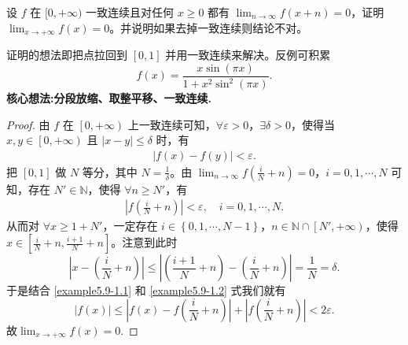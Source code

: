 \documentclass[../../main.tex]{subfiles}%
\begin{document}
\begin{example}
设 \( f \) 在 \([0,+\infty)\) 一致连续且对任何 \( x \geqslant  0 \) 都有 \(\lim_{n \to \infty} f(x+n) = 0\)，证明 \(\lim_{x \to +\infty} f(x) = 0\)。并说明如果去掉一致连续则结论不对。
\end{example}
\begin{note}
证明的想法即把点拉回到 \([0,1]\) 并用一致连续来解决。反例可积累
\[
f(x) = \frac{x \sin (\pi x)}{1 + x^2 \sin^2 (\pi x)}.
\]
\textbf{核心想法:分段放缩、取整平移、一致连续.}
\end{note}
\begin{proof}

由 $f$ 在 $\left[ 0, +\infty \right)$ 上一致连续可知，$\forall \varepsilon > 0$，$\exists \delta > 0$，使得当 $x, y \in \left[ 0, +\infty \right)$ 且 $\left| x - y \right| \leqslant \delta$ 时，有
\begin{align}
\left| f\left( x \right) - f\left( y \right) \right| < \varepsilon. \label{example5.9-1.1}
\end{align}
把 $\left[ 0,1 \right]$ 做 $N$ 等分，其中 $N = \frac{1}{\delta}$。由 $\lim_{n \rightarrow \infty} f\left( \frac{i}{N} + n \right) = 0$，$i = 0, 1, \cdots, N$ 可知，存在 $N' \in \mathbb{N}$，使得 $\forall n \geqslant N'$，有
\begin{align}
\left| f\left( \frac{i}{N} + n \right) \right| < \varepsilon, \quad i = 0, 1, \cdots, N. \label{example5.9-1.2} 
\end{align}
从而对 $\forall x \geqslant 1 + N'$，一定存在 $i \in \left\{ 0, 1, \cdots, N - 1 \right\}$，$n \in \mathbb{N} \cap \left[ N', +\infty \right)$，使得 $x \in \left[ \frac{i}{N} + n, \frac{i + 1}{N} + n \right]$。注意到此时
\[
\left| x - \left( \frac{i}{N} + n \right) \right| \leqslant \left| \left( \frac{i + 1}{N} + n \right) - \left( \frac{i}{N} + n \right) \right| = \frac{1}{N} = \delta.
\]
于是结合 \eqref{example5.9-1.1} 和 \eqref{example5.9-1.2} 式我们就有
\[
\left| f\left( x \right) \right| \leqslant \left| f\left( x \right) - f\left( \frac{i}{N} + n \right) \right| + \left| f\left( \frac{i}{N} + n \right) \right| < 2\varepsilon.
\]
故\(\lim_{x \to +\infty} f(x) = 0\).

\end{proof}
\end{document}
